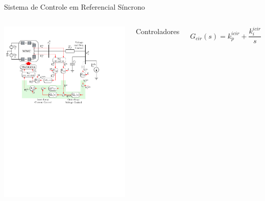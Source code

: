 






\begin{frame}{Sistema de Controle em Referencial Síncrono}




\begin{columns}
\centering

\includegraphics[width=0.95\linewidth]{./figuras/figuras_srf/controle_VI_SRF2}

\centering

Controladores

\begin{equation*}
G_{cir}(s) = k_p^{icir} + \frac{k_i^{icir} }{s}
\end{equation*}


\end{columns}
\end{frame}
